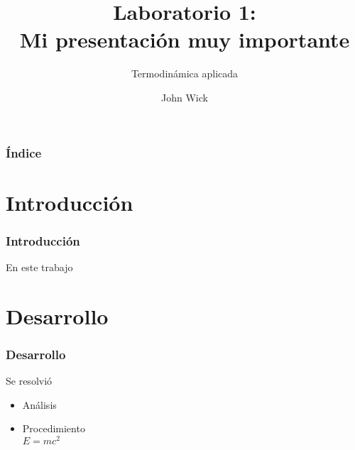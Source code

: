 \documentclass[aspectratio=169]{beamer}
\title{Laboratorio 1: \\Mi presentación muy importante}
\subtitle{Termodinámica aplicada}
\author{John Wick}
\begin{document}
\maketitle

\begin{frame}
	\frametitle{Índice}
	\tableofcontents
\end{frame}

\section{Introducción}
\begin{frame}
	\frametitle{Introducción}
	En este trabajo
\end{frame}

\section{Desarrollo}
\begin{frame}
	\frametitle{Desarrollo}
	Se resolvió
	\begin{itemize}
		\item Análisis
		\item Procedimiento\\
		$E=mc^2$
	\end{itemize}
\end{frame}
\end{document}
